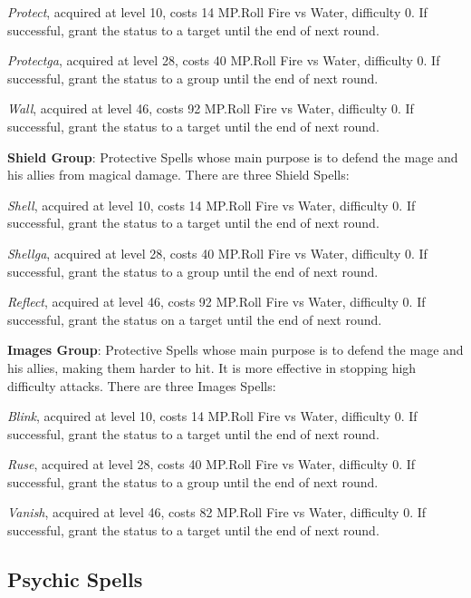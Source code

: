 \begin{multicols}{2}
    \textit{Protect}, acquired at level 10, costs 14 MP.\@{}Roll Fire vs Water, difficulty 0. If successful, grant the  status to a target until the end of next round.

    \textit{Protectga}, acquired at level 28, costs 40 MP.\@{}Roll Fire vs Water, difficulty 0. If successful, grant the  status to a group until the end of next round.

    \textit{Wall}, acquired at level 46, costs 92 MP.\@{}Roll Fire vs Water, difficulty 0. If successful, grant the  status to a target until the end of next round.

    \textbf{Shield Group}: Protective Spells whose main purpose is to defend the mage and his allies from magical damage. There are three Shield Spells:

    \textit{Shell}, acquired at level 10, costs 14 MP.\@{}Roll Fire vs Water, difficulty 0. If successful, grant the  status to a target until the end of next round.

    \textit{Shellga}, acquired at level 28, costs 40 MP.\@{}Roll Fire vs Water, difficulty 0. If successful, grant the  status to a group until the end of next round.

    \textit{Reflect}, acquired at level 46, costs 92 MP.\@{}Roll Fire vs Water, difficulty 0. If successful, grant the  status on a target until the end of next round.

    \textbf{Images Group}: Protective Spells whose main purpose is to defend the mage and his allies, making them harder to hit. It is more effective in stopping high difficulty attacks. There are three Images Spells:

    \textit{Blink}, acquired at level 10, costs 14 MP.\@{}Roll Fire vs Water, difficulty 0. If successful, grant the  status to a target until the end of next round.

    \textit{Ruse}, acquired at level 28, costs 40 MP.\@{}Roll Fire vs Water, difficulty 0. If successful, grant the  status to a group until the end of next round.

    \textit{Vanish}, acquired at level 46, costs 82 MP.\@{}Roll Fire vs Water, difficulty 0. If successful, grant the  status to a target until the end of next round.

    \subsection{Psychic Spells}\label{subsec:white-psychic}


\end{multicols}
